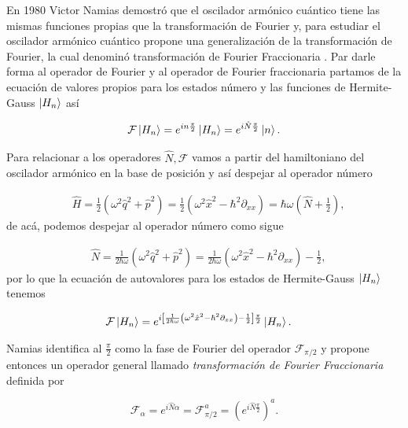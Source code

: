     En 1980 Victor Namias demostró que el oscilador armónico cuántico tiene las mismas funciones propias que la transformación de Fourier y, para estudiar el oscilador armónico cuántico propone una generalización de la transformación de Fourier, la cual denominó transformación de Fourier Fraccionaria \cite{namias1980fractional}. Par darle forma al operador de Fourier y al operador de Fourier fraccionaria partamos de la ecuación de valores propios para los estados número y las funciones de Hermite-Gauss $\ket{H_n}$ así

    \begin{equation}
        \mathcal{F}\ket{H_n} = e^{in\frac{\pi}{2}}\ket{H_n} = e^{i\hat{N}\frac{\pi}{2}}\ket{n}.
    \end{equation}

    Para relacionar a los operadores $\hat{N},\mathcal{F}$ vamos a partir del hamiltoniano del oscilador armónico en la base de posición y así despejar al operador número

    \begin{align}
        & \hat{H} = \frac{1}{2}\left( \omega^2\hat{q}^2 + \hat{p}^2 \right) = \frac{1}{2}\left( \omega^2 \hat{x}^2 - \hbar^{2}\partial_{xx} \right) = \hbar\omega \left( \hat{N}+\frac{1}{2} \right),
    \end{align}
    de acá, podemos despejar al operador número como sigue

    \begin{align}
        & \hat{N} = \frac{1}{2\hbar\omega}\left( \omega^2\hat{q}^2 + \hat{p}^2 \right) = \frac{1}{2\hbar\omega}\left( \omega^2 \hat{x}^2 - \hbar^{2}\partial_{xx} \right) - \frac{1}{2},
    \end{align}
    por lo que la ecuación de autovalores para los estados de Hermite-Gauss $\ket{H_n}$ tenemos

    \begin{align}
        & \mathcal{F}\ket{H_n} = e^{i \left[ \frac{1}{2\hbar\omega} \left( \omega^2 \hat{x}^2 - \hbar^{2}\partial_{xx} \right) - \frac{1}{2} \right]\frac{\pi}{2} }\ket{H_n}.
    \end{align}

    Namias identifica al $\frac{\pi}{2}$ como la fase de Fourier del operador $\mathcal{F}_{\pi/2}$ y propone entonces un operador general llamado \textit{transformación de Fourier Fraccionaria} definida por 

    \begin{equation}\label{eq:OpFFR}
        \mathcal{F}_\alpha = e^{i\hat{N}\alpha} = \mathcal{F}_{\pi/2}^a = \left( e^{i\hat{N}\frac{\pi}{2}} \right)^a.
    \end{equation}

